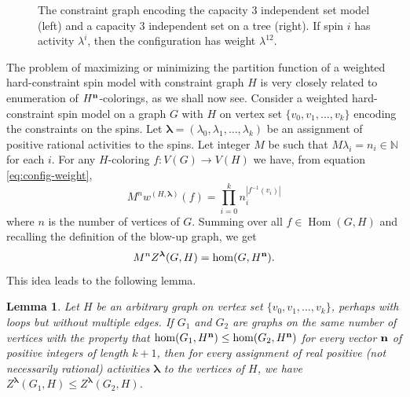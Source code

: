 \documentclass[11pt]{article}
\newtheorem{lemma}[theorem]{Lemma}
\theoremstyle{definition}
\DeclareMathOperator{\Hom}{Hom}
\begin{document}
\begin{figure}[ht]
    \caption{The constraint graph encoding the capacity $3$ independent set model (left) and a capacity $3$ independent set on a tree (right). If spin $i$ has activity $\lambda^i$, then the configuration has weight $\lambda^{12}$.}
    \label{fig:cappacityc}
\end{figure}

The problem of maximizing or minimizing the partition function of a weighted hard-constraint spin model with constraint graph $H$ is very closely related to enumeration of $H^{\bf n}$-colorings, as we shall now see. Consider a weighted hard-constraint spin model on a graph $G$ with $H$ on vertex set $\{v_0, v_1, \ldots, v_k\}$ encoding the constraints on the spins. Let ${\boldsymbol\lambda}=(\lambda_0, \lambda_1, \ldots, \lambda_k)$ be an assignment of positive rational activities to the spins. Let integer $M$ be such that $M\lambda_i = n_i \in {\mathbb N}$ for each $i$. For any $H$-coloring $f:V(G)\rightarrow V(H)$ we have, from equation \eqref{eq:config-weight},
\[
M^nw^{(H,{\boldsymbol\lambda})}(f) = \prod_{i=0}^k n_i^{|f^{-1}(v_i)|}
\]
where $n$ is the number of vertices of $G$. Summing over all $f \in \Hom(G,H)$ and recalling the definition of the blow-up graph, we get
\begin{equation} \label{eq:weighted-partition-function}
M^n Z^{\boldsymbol\lambda}(G,H) = \hom(G, H^{\bf n}).
\end{equation}
This idea leads to the following lemma.        
\begin{lemma} \label{lem:blow-up}
Let $H$ be an arbitrary graph on vertex set $\{v_0, v_1, \ldots, v_k\}$, perhaps with loops but without multiple edges. If $G_1$ and $G_2$ are graphs on the same number of vertices with the property that $\hom(G_1, H^{\bf n}) \le \hom(G_2, H^{\bf n})$ for every vector ${\bf n}$ of positive integers of length $k+1$, then for every assignment of real positive (not necessarily rational) activities ${\boldsymbol\lambda}$ to the vertices of $H$, we have $Z^{\boldsymbol\lambda}(G_1,H) \le Z^{\boldsymbol\lambda}(G_2,H)$.   
\end{lemma} 
\end{document}
